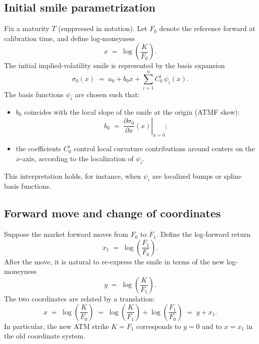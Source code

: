 \documentclass[11pt,a4paper]{report}
\begin{document}
\subsection{Initial smile parametrization}
Fix a maturity $T$ (suppressed in notation).
Let $F_0$ denote the reference forward at calibration time, and define log-moneyness
\begin{equation}
x \;=\; \log\!\left(\frac{K}{F_0}\right).
\end{equation}
The initial implied-volatility smile is represented by the basis expansion
\begin{equation}
\sigma_0(x)
\;=\;
a_0 + b_0 x + \sum_{i=1}^n C_0^{i}\,\psi_i(x).
\label{eq:sigma0_basis}
\end{equation}
The basis functions $\psi_i$ are chosen such that:
\begin{itemize}
\item $b_0$ coincides with the local slope of the smile at the origin (ATMF skew):
\begin{equation}
b_0 \;=\; \left.\frac{\partial \sigma_0}{\partial x}(x)\right|_{x=0};
\end{equation}
\item the coefficients $C_0^i$ control local curvature contributions around centers on the $x$-axis, according to the localization of $\psi_i$.
\end{itemize}
This interpretation holds, for instance, when $\psi_i$ are localized bumps or spline basis functions.

\subsection{Forward move and change of coordinates}
Suppose the market forward moves from $F_0$ to $F_1$.
Define the log-forward return
\begin{equation}
x_1 \;=\; \log\!\left(\frac{F_1}{F_0}\right).
\label{eq:x1_def}
\end{equation}
After the move, it is natural to re-express the smile in terms of the new log-moneyness
\begin{equation}
y \;=\; \log\!\left(\frac{K}{F_1}\right).
\end{equation}
The two coordinates are related by a translation:
\begin{equation}
x \;=\; \log\!\left(\frac{K}{F_0}\right)
\;=\;
\log\!\left(\frac{K}{F_1}\right) + \log\!\left(\frac{F_1}{F_0}\right)
\;=\;
y + x_1.
\label{eq:coord_translation}
\end{equation}
In particular, the new ATM strike $K=F_1$ corresponds to $y=0$ and to $x=x_1$ in the old coordinate system.
\end{document}
